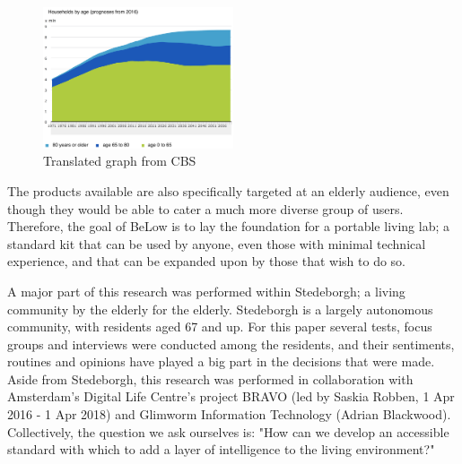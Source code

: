 \documentclass{below-ext}
\begin{document}
\begin{figure}
\centering
\includegraphics[width=0.5\textwidth]{cbs_household_age_report}
\caption[Translated graph]{Translated graph from CBS\footnotemark }
\end{figure}
The products available are also specifically targeted at an elderly audience, even though they would be able to cater a much more diverse group of users. Therefore, the goal of BeLow is to lay the foundation for a portable living lab; a standard kit that can be used by anyone, even those with minimal technical experience, and that can be expanded upon by those that wish to do so.

A major part of this research was performed within Stedeborgh; a living community by the elderly for the elderly. Stedeborgh is a largely autonomous community, with residents aged 67 and up. For this paper several tests, focus groups and interviews were conducted among the residents, and their sentiments, routines and opinions have played a big part in the decisions that were made. Aside from Stedeborgh, this research was performed in collaboration with Amsterdam's Digital Life Centre's project BRAVO (led by Saskia Robben, 1 Apr 2016 - 1 Apr 2018) and Glimworm Information Technology (Adrian Blackwood). Collectively, the question we ask ourselves is: "How can we develop an accessible standard with which to add a layer of intelligence to the living environment?" 
\end{document}
